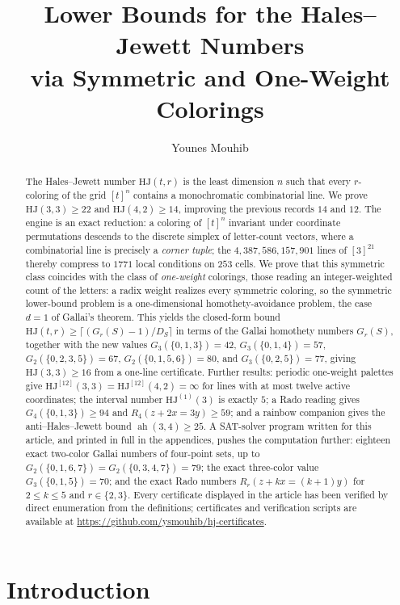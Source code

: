\documentclass[12pt]{article}
\title{Lower Bounds for the Hales--Jewett Numbers\\
via Symmetric and One-Weight Colorings}
\author{Younes Mouhib}
\newcommand{\HJ}{\mathrm{HJ}}
\DeclareMathOperator{\ah}{ah}
\begin{document}
\maketitle


\begin{abstract}
The Hales--Jewett number $\HJ(t,r)$ is the least dimension $n$ such that
every $r$-coloring of the grid $[t]^{n}$ contains a monochromatic
combinatorial line. We prove $\HJ(3,3)\ge 22$ and $\HJ(4,2)\ge 14$,
improving the previous records $14$ and $12$. The engine is an exact
reduction: a coloring of $[t]^{n}$ invariant under coordinate
permutations descends to the discrete simplex of letter-count vectors,
where a combinatorial line is precisely a \emph{corner tuple}; the
$4{,}387{,}586{,}157{,}901$ lines of $[3]^{21}$ thereby compress to
$1771$ local conditions on $253$ cells. We prove that this symmetric
class coincides with the class of \emph{one-weight} colorings, those
reading an integer-weighted count of the letters: a radix weight
realizes every symmetric coloring, so the symmetric lower-bound problem
is a one-dimensional homothety-avoidance problem, the case $d=1$ of
Gallai's theorem. This yields the closed-form bound
$\HJ(t,r)\ge\lceil(G_{r}(S)-1)/D_{S}\rceil$ in terms of the Gallai
homothety numbers $G_{r}(S)$, together with the new values
$G_{3}(\{0,1,3\})=42$, $G_{3}(\{0,1,4\})=57$, $G_{2}(\{0,2,3,5\})=67$,
$G_{2}(\{0,1,5,6\})=80$, and $G_{3}(\{0,2,5\})=77$, giving
$\HJ(3,3)\ge 16$ from a one-line certificate. Further results:
periodic one-weight palettes give $\HJ^{[12]}(3,3)=\HJ^{[12]}(4,2)
=\infty$ for lines with at most twelve active coordinates; the interval
number $\HJ^{(1)}(3)$ is exactly $5$; a Rado reading gives
$G_{4}(\{0,1,3\})\ge 94$ and $R_{4}(z+2x=3y)\ge 59$; and a rainbow
companion gives the anti--Hales--Jewett bound $\ah(3,4)\ge 25$. A
SAT-solver program written for this article, and printed in full in
the appendices, pushes the computation further: eighteen exact two-color Gallai
numbers of four-point sets, up to
$G_{2}(\{0,1,6,7\})=G_{2}(\{0,3,4,7\})=79$; the exact three-color
value $G_{3}(\{0,1,5\})=70$; and the exact Rado numbers
$R_{r}(z+kx=(k+1)y)$ for $2\le k\le 5$ and $r\in\{2,3\}$. Every
certificate displayed in the article has been verified by direct
enumeration from the definitions; certificates and verification scripts
are available at \url{https://github.com/ysmouhib/hj-certificates}.
\end{abstract}


\section{Introduction}\label{sec:intro}
\end{document}
